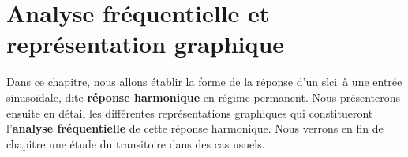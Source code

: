 \chapter[Analyse fréquentielle]
        {Analyse fréquentielle et représentation graphique\label{chap-repfreq}}
\minitoc
\newpage
Dans ce chapitre, nous allons établir la forme de la réponse d'un \gls{slci}~à 
une entrée sinuso\"idale, dite \textbf{réponse harmonique} en régime permanent.
Nous présenterons ensuite en détail les différentes représentations graphiques 
qui constitueront l'\textbf{analyse fréquentielle} de cette réponse harmonique.
Nous verrons en fin de chapitre une étude du transitoire dans des cas usuels.
